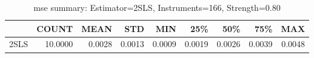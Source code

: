 \begin{table}[ht]
\centering
\caption{mse summary: Estimator=2SLS, Instruments=166, Strength=0.80}
\begin{tabular}{lrrrrrrrr}
\toprule
 & COUNT & MEAN & STD & MIN & 25\% & 50\% & 75\% & MAX \\
\midrule
2SLS & 10.0000 & 0.0028 & 0.0013 & 0.0009 & 0.0019 & 0.0026 & 0.0039 & 0.0048 \\
\bottomrule
\end{tabular}
\end{table}
